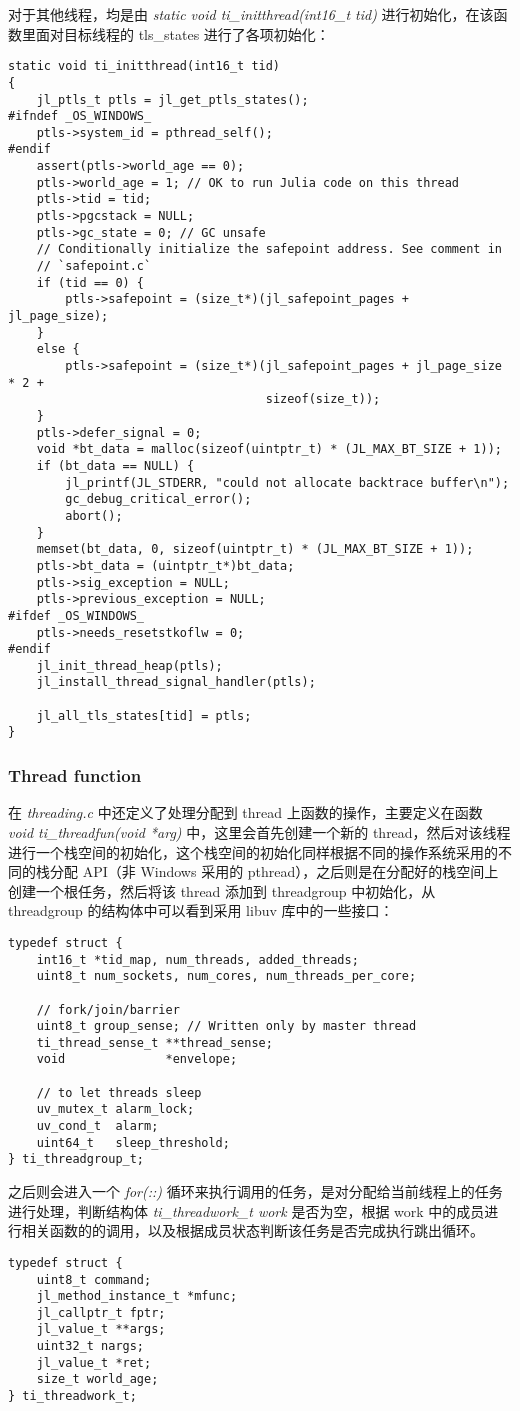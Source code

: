 对于其他线程，均是由 \emph{static void ti\_initthread(int16\_t tid)} 进行初始化，在该函数里面对目标线程的 tls\_states 进行了各项初始化：
\begin{lstlisting}
static void ti_initthread(int16_t tid)
{
    jl_ptls_t ptls = jl_get_ptls_states();
#ifndef _OS_WINDOWS_
    ptls->system_id = pthread_self();
#endif
    assert(ptls->world_age == 0);
    ptls->world_age = 1; // OK to run Julia code on this thread
    ptls->tid = tid;
    ptls->pgcstack = NULL;
    ptls->gc_state = 0; // GC unsafe
    // Conditionally initialize the safepoint address. See comment in
    // `safepoint.c`
    if (tid == 0) {
        ptls->safepoint = (size_t*)(jl_safepoint_pages + jl_page_size);
    }
    else {
        ptls->safepoint = (size_t*)(jl_safepoint_pages + jl_page_size * 2 +
                                    sizeof(size_t));
    }
    ptls->defer_signal = 0;
    void *bt_data = malloc(sizeof(uintptr_t) * (JL_MAX_BT_SIZE + 1));
    if (bt_data == NULL) {
        jl_printf(JL_STDERR, "could not allocate backtrace buffer\n");
        gc_debug_critical_error();
        abort();
    }
    memset(bt_data, 0, sizeof(uintptr_t) * (JL_MAX_BT_SIZE + 1));
    ptls->bt_data = (uintptr_t*)bt_data;
    ptls->sig_exception = NULL;
    ptls->previous_exception = NULL;
#ifdef _OS_WINDOWS_
    ptls->needs_resetstkoflw = 0;
#endif
    jl_init_thread_heap(ptls);
    jl_install_thread_signal_handler(ptls);

    jl_all_tls_states[tid] = ptls;
} 
\end{lstlisting}

\subsubsection{Thread function}
在 \emph{threading.c} 中还定义了处理分配到 thread 上函数的操作，主要定义在函数 \emph{void ti\_threadfun(void *arg)} 中，这里会首先创建一个新的 thread，然后对该线程进行一个栈空间的初始化，这个栈空间的初始化同样根据不同的操作系统采用的不同的栈分配 API（非 Windows 采用的 pthread），之后则是在分配好的栈空间上创建一个根任务，然后将该 thread 添加到 threadgroup 中初始化，从 threadgroup 的结构体中可以看到采用 libuv 库中的一些接口：
\begin{lstlisting}
typedef struct {
    int16_t *tid_map, num_threads, added_threads;
    uint8_t num_sockets, num_cores, num_threads_per_core;

    // fork/join/barrier
    uint8_t group_sense; // Written only by master thread
    ti_thread_sense_t **thread_sense;
    void              *envelope;

    // to let threads sleep
    uv_mutex_t alarm_lock;
    uv_cond_t  alarm;
    uint64_t   sleep_threshold;
} ti_threadgroup_t;
\end{lstlisting}
之后则会进入一个 \emph{for(::)} 循环来执行调用的任务，是对分配给当前线程上的任务进行处理，判断结构体 \emph{ti\_threadwork\_t work} 是否为空，根据 work 中的成员进行相关函数的的调用，以及根据成员状态判断该任务是否完成执行跳出循环。
\begin{lstlisting}
typedef struct {
    uint8_t command;
    jl_method_instance_t *mfunc;
    jl_callptr_t fptr;
    jl_value_t **args;
    uint32_t nargs;
    jl_value_t *ret;
    size_t world_age;
} ti_threadwork_t;
\end{lstlisting}